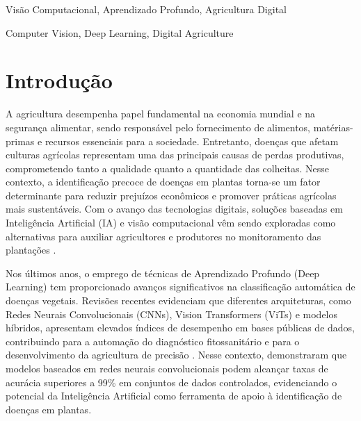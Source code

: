\documentclass[portuguese]{sbc2025}%
\begin{document}
\begin{frontmatter}
\begin{pchaves}
Visão Computacional, Aprendizado Profundo, Agricultura Digital
\end{pchaves}

\begin{keywords}
Computer Vision, Deep Learning, Digital Agriculture
\end{keywords}


\end{frontmatter}


\section{Introdução}
\label{sec:intro}

A agricultura desempenha papel fundamental na economia mundial e na segurança alimentar, sendo responsável pelo fornecimento de 
alimentos, matérias-primas e recursos essenciais para a sociedade. Entretanto, doenças que afetam culturas agrícolas representam 
uma das principais causas de perdas produtivas, comprometendo tanto a qualidade quanto a quantidade das colheitas. Nesse contexto, 
a identificação precoce de doenças em plantas torna-se um fator determinante para reduzir prejuízos econômicos e promover práticas 
agrícolas mais sustentáveis. Com o avanço das tecnologias digitais, soluções baseadas em Inteligência Artificial (IA) e visão 
computacional vêm sendo exploradas como alternativas para auxiliar agricultores e produtores no monitoramento das plantações \citep{ref1}. 

Nos últimos anos, o emprego de técnicas de Aprendizado Profundo (Deep Learning) tem proporcionado avanços significativos na 
classificação automática de doenças vegetais. Revisões recentes evidenciam que diferentes arquiteturas, como Redes Neurais 
Convolucionais (CNNs), Vision Transformers (ViTs) e modelos híbridos, apresentam elevados índices de desempenho em bases públicas 
de dados, contribuindo para a automação do diagnóstico fitossanitário e para o desenvolvimento da agricultura de precisão
\citep{ref2,ref3}. Nesse contexto, \citep{ref1} demonstraram que modelos baseados em redes neurais convolucionais podem alcançar 
taxas de acurácia superiores a 99\% em conjuntos de dados controlados, evidenciando o potencial da Inteligência Artificial como 
ferramenta de apoio à identificação de doenças em plantas.
\end{document}
